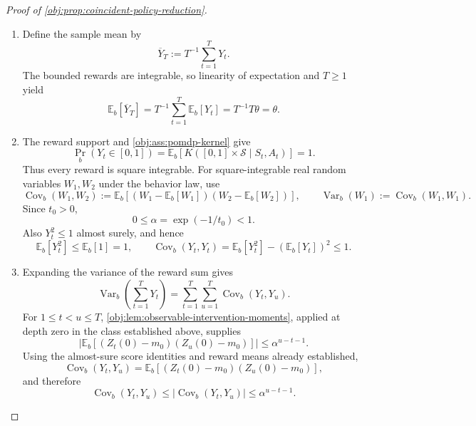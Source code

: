 \begin{proof}[Proof of \cref{obj:prop:coincident-policy-reduction}]
\begin{enumerate}
\item Define the sample mean by
\[
\overline Y_T:=T^{-1}\sum_{t=1}^{T}Y_t.
\]
The bounded rewards are integrable, so linearity of expectation and \(T\geq1\) yield
\[
\mathbb E_b[\overline Y_T]
=
T^{-1}\sum_{t=1}^{T}\mathbb E_b[Y_t]
=
T^{-1}T\theta
=
\theta.
\]

\item The reward support and \cref{obj:ass:pomdp-kernel} give
\[
\Pr_b(Y_t\in[0,1])
=
\mathbb E_b\!\left[
K([0,1]\times\mathcal S\mid S_t,A_t)
\right]
=1.
\]
Thus every reward is square integrable. For square-integrable real random variables \(W_1,W_2\) under the behavior law, use
\[
\operatorname{Cov}_b(W_1,W_2)
:=
\mathbb E_b\!\left[
(W_1-\mathbb E_b[W_1])(W_2-\mathbb E_b[W_2])
\right],
\qquad
\operatorname{Var}_b(W_1)
:=
\operatorname{Cov}_b(W_1,W_1).
\]
Since \(t_0>0\),
\[
0\leq\alpha=\exp(-1/t_0)<1.
\]
Also \(Y_t^2\leq1\) almost surely, and hence
\[
\mathbb E_b[Y_t^2]\leq\mathbb E_b[1]=1,
\qquad
\operatorname{Cov}_b(Y_t,Y_t)
=
\mathbb E_b[Y_t^2]-(\mathbb E_b[Y_t])^2
\leq1.
\]

\item Expanding the variance of the reward sum gives
\[
\operatorname{Var}_b\!\left(\sum_{t=1}^{T}Y_t\right)
=
\sum_{t=1}^{T}\sum_{u=1}^{T}
\operatorname{Cov}_b(Y_t,Y_u).
\]
For \(1\leq t<u\leq T\), \cref{obj:lem:observable-intervention-moments}, applied at depth zero in the class established above, supplies
\[
\left|
\mathbb E_b\!\left[
(Z_t(0)-m_0)(Z_u(0)-m_0)
\right]
\right|
\leq\alpha^{u-t-1}.
\]
Using the almost-sure score identities and reward means already established,
\[
\operatorname{Cov}_b(Y_t,Y_u)
=
\mathbb E_b\!\left[
(Z_t(0)-m_0)(Z_u(0)-m_0)
\right],
\]
and therefore
\[
\operatorname{Cov}_b(Y_t,Y_u)
\leq
\left|\operatorname{Cov}_b(Y_t,Y_u)\right|
\leq\alpha^{u-t-1}.
\]


\end{enumerate}
\end{proof}
